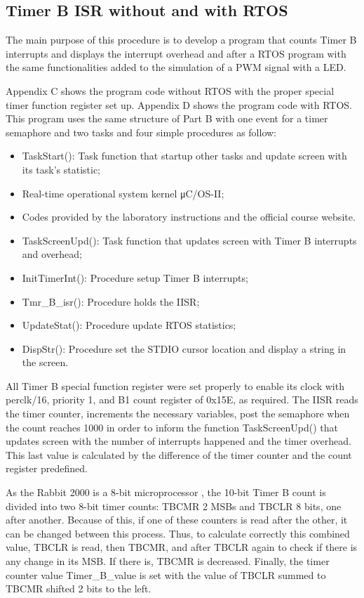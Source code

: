 \subsection{Timer B ISR without and with RTOS}

The main purpose of this procedure is to develop a program that counts Timer B interrupts and displays the interrupt overhead and after a RTOS program with the same functionalities added to the simulation of a PWM signal with a LED.

Appendix C shows the program code without RTOS with the proper special timer function register set up. Appendix D shows the program code with RTOS. This program uses the same structure of Part B with one event for a timer semaphore and two tasks and four simple procedures as follow:

\begin{itemize}[label={--}]
\item TaskStart(): Task function that startup other tasks and update screen with its task's statistic;
\item Real-time operational system kernel μC/OS-II;
\item Codes provided by the laboratory instructions and the official course website.
\item TaskScreenUpd(): Task function that updates screen with Timer B interrupts and overhead;
\item InitTimerInt(): Procedure setup Timer B interrupts;
\item Tmr_B_isr(): Procedure holds the IISR;
\item UpdateStat(): Procedure update RTOS statistics;
\item DispStr(): Procedure set the STDIO cursor location and display a string in the screen.
\end{itemize}

All Timer B special function register were set properly to enable its clock with perclk/16, priority 1, and B1 count register of 0x15E, as required. The IISR reads the timer counter, increments the necessary variables, post the semaphore when the count reaches 1000 in order to inform the function TaskScreenUpd() that updates screen with the number of interrupts happened and the timer overhead. This last value is calculated by the difference of the timer counter and the count register predefined.

As the Rabbit 2000 is a 8-bit microprocessor \cite{Digi_International_2007}, the 10-bit Timer B count is divided into two 8-bit timer counts: TBCMR 2 MSBs and TBCLR 8 bits, one after another. Because of this, if one of these counters is read after the other, it can be changed between this process. Thus, to calculate correctly this combined value, TBCLR is read, then TBCMR, and after TBCLR again to check if there is any change in its MSB. If there is, TBCMR is decreased. Finally, the timer counter value Timer_B_value is set with the value of TBCLR summed to TBCMR shifted 2 bits to the left. 

